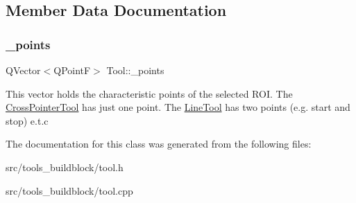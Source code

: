 \subsection{Member Data Documentation}
\mbox{\label{classTool_a68be77a2e364a7b13d7206388ba5843e}} 
\subsubsection{\texorpdfstring{\+\_\+points}{\_points}}
{\footnotesize\ttfamily Q\+Vector$<$Q\+PointF$>$ Tool\+::\+\_\+points\hspace{0.3cm}{\ttfamily [protected]}}

This vector holds the characteristic points of the selected R\+OI. The \mbox{\hyperlink{classCrossPointerTool}{Cross\+Pointer\+Tool}} has just one point. The \mbox{\hyperlink{classLineTool}{Line\+Tool}} has two points (e.\+g. start and stop) e.\+t.\+c 

The documentation for this class was generated from the following files\+:\begin{DoxyCompactItemize}
\item 
src/tools\+\_\+buildblock/tool.\+h\item 
src/tools\+\_\+buildblock/tool.\+cpp\end{DoxyCompactItemize}

